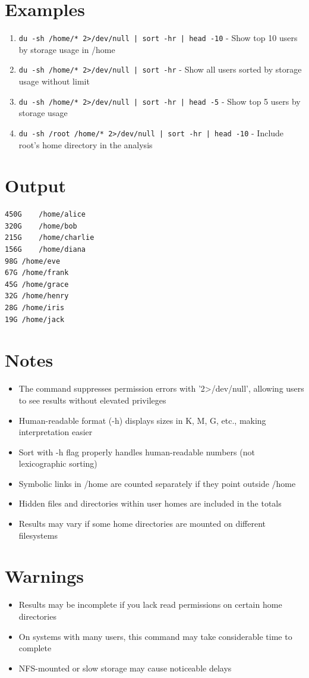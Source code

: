 \documentclass[openany]{book}
\begin{document}
\section*{Examples}
\begin{enumerate}
  \item \texttt{du -sh /home/* 2>/dev/null | sort -hr | head -10} - Show top 10 users by storage usage in /home
  \item \texttt{du -sh /home/* 2>/dev/null | sort -hr} - Show all users sorted by storage usage without limit
  \item \texttt{du -sh /home/* 2>/dev/null | sort -hr | head -5} - Show top 5 users by storage usage
  \item \texttt{du -sh /root /home/* 2>/dev/null | sort -hr | head -10} - Include root's home directory in the analysis
\end{enumerate}

\section*{Output}
\begin{lstlisting}
450G	/home/alice
320G	/home/bob
215G	/home/charlie
156G	/home/diana
98G	/home/eve
67G	/home/frank
45G	/home/grace
32G	/home/henry
28G	/home/iris
19G	/home/jack
\end{lstlisting}

\section*{Notes}
\begin{itemize}
  \item The command suppresses permission errors with '2>/dev/null', allowing users to see results without elevated privileges
  \item Human-readable format (-h) displays sizes in K, M, G, etc., making interpretation easier
  \item Sort with -h flag properly handles human-readable numbers (not lexicographic sorting)
  \item Symbolic links in /home are counted separately if they point outside /home
  \item Hidden files and directories within user homes are included in the totals
  \item Results may vary if some home directories are mounted on different filesystems
\end{itemize}

\section*{Warnings}
\begin{itemize}
  \item Results may be incomplete if you lack read permissions on certain home directories
  \item On systems with many users, this command may take considerable time to complete
  \item NFS-mounted or slow storage may cause noticeable delays
\end{itemize}
\end{document}

